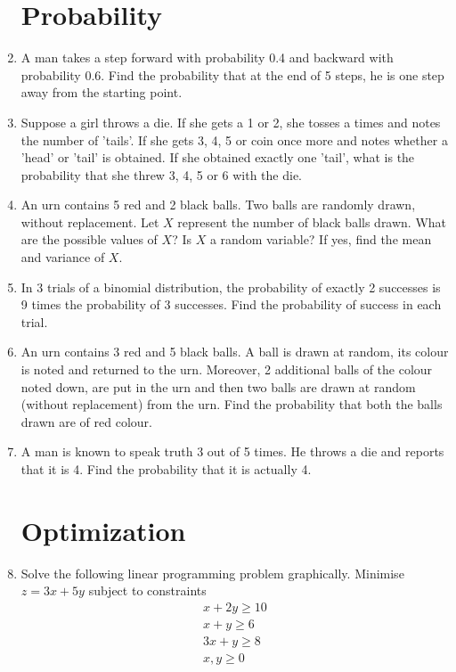 \documentclass[12pt,-letter paper]{article}
\begin{document}
\begin{enumerate}
\section{Probability}
	\item A man takes a step forward with probability 0.4 and backward with probability 0.6. Find the probability that at the end of 5 steps, he is one step away from the starting point.


	\item Suppose a girl throws a die. If she gets a 1 or 2, she tosses a times and notes the number of 'tails'. If she gets 3, 4, 5 or coin once more and notes whether a 'head' or 'tail' is obtained. If she obtained exactly one 'tail', what is the probability that she threw 3, 4, 5 or 6 with the die.


	\item An urn contains 5 red and 2 black balls. Two balls are randomly drawn, without replacement. Let $X$ represent the number of black balls drawn. What are the possible values of $X$? Is $X$ a random variable? If yes, find the mean and variance of $X$.

	\item In 3 trials of a binomial distribution, the probability of exactly 2 successes is 9 times the probability of 3 successes. Find the probability of success in each trial.

	\item An urn contains 3 red and 5 black balls. A ball is drawn at random, its colour is noted and returned to the urn. Moreover, 2 additional balls of the colour noted down, are put in the urn and then two balls are drawn at random (without replacement) from the urn. Find the probability that both the balls drawn are of red colour.
     \item A man is known to speak truth 3 out of 5 times. He throws a die and reports that it is 4. Find the probability that it is actually 4.

\section{Optimization}
	\item Solve the following linear programming problem graphically. Minimise $z = 3x+5y$ subject to constraints
     \begin{align*}
         x+2y\ge 10\\
         x+y\ge 6\\
         3x+y\ge8\\
         x,y\ge0
     \end{align*}
 

\end{enumerate}
\end{document}

